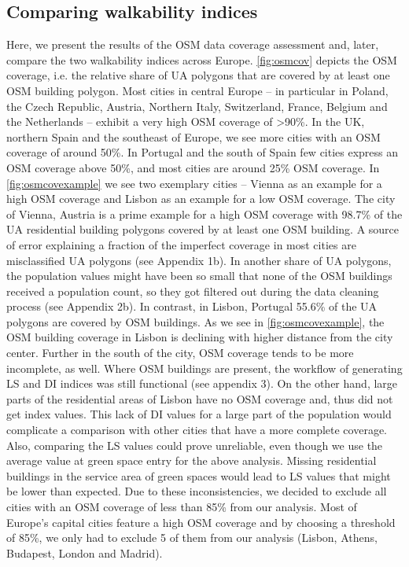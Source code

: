 \documentclass[10pt]{article}
\begin{document}
\subsection{Comparing walkability indices}
Here, we present the results of the OSM data coverage assessment and, later, compare the two walkability indices across Europe.
\ref{fig:osmcov} depicts the OSM coverage, i.e. the relative share of UA polygons that are covered by at least one OSM building polygon. 
Most cities in central Europe – in particular in Poland, the Czech Republic, Austria, Northern Italy, Switzerland, France, Belgium and the Netherlands – exhibit a very high OSM coverage of \textgreater 90\%. 
In the UK, northern Spain and the southeast of Europe, we see more cities with an OSM coverage of around 50\%.
In Portugal and the south of Spain few cities express an OSM coverage above 50\%, and most cities are around 25\% OSM coverage.
In \ref{fig:osmcovexample} we see two exemplary cities – Vienna as an example for a high OSM coverage and Lisbon as an example for a low OSM coverage.
The city of Vienna, Austria is a prime example for a high OSM coverage with 98.7\% of the UA residential building polygons covered by at least one OSM building.
A source of error explaining a fraction of the imperfect coverage in most cities are misclassified UA polygons (see Appendix 1b).
In another share of UA polygons, the population values might have been so small that none of the OSM buildings received a population count, so they got filtered out during the data cleaning process (see Appendix 2b).
In contrast, in Lisbon, Portugal 55.6\% of the UA polygons are covered by OSM buildings. 
As we see in \ref{fig:osmcovexample}, the OSM building coverage in Lisbon is declining with higher distance from the city center.
Further in the south of the city, OSM coverage tends to be more incomplete, as well.
Where OSM buildings are present, the workflow of generating LS and DI indices was still functional (see appendix 3).
On the other hand, large parts of the residential areas of Lisbon have no OSM coverage and, thus did not get index values.
This lack of DI values for a large part of the population would complicate a comparison with other cities that have a more complete coverage.
Also, comparing the LS values could prove unreliable, even though we use the average value at green space entry for the above analysis.
Missing residential buildings in the service area of green spaces would lead to LS values that might be lower than expected.
Due to these inconsistencies, we decided to exclude all cities with an OSM coverage of less than 85\% from our analysis.
Most of Europe’s capital cities feature a high OSM coverage and by choosing a threshold of 85\%, we only had to exclude 5 of them from our analysis (Lisbon, Athens, Budapest, London and Madrid).  
\end{document}
